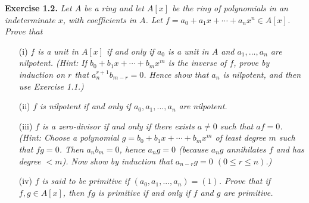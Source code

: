 \documentclass{article}
\begin{document}



\textbf{Exercise 1.2.}
\emph{Let $A$ be a ring and
let $A[x]$ be the ring of polynomials in an indeterminate $x$,
with coefficients in $A$.
Let $f = a_0 + a_1 x + \cdots + a_n x^n \in A[x]$.
Prove that}
\begin{enumerate}
\item[(i)]
\emph{$f$ is a unit in $A[x]$ if and only if
$a_0$ is a unit in $A$ and
$a_1, ..., a_n$ are nilpotent.
(Hint: If $b_0 + b_1 x + \cdots + b_m x^m$ is the inverse of $f$,
prove by induction on $r$ that $a_n^{r+1} b_{m-r} = 0$.
Hence show that $a_n$ is nilpotent, and then use Exercise 1.1.)}
\item[(ii)]
\emph{$f$ is nilpotent if and only if
$a_0, a_1, ..., a_n$ are nilpotent.}
\item[(iii)]
\emph{$f$ is a zero-divisor if and only if
there exists $a \neq 0$ such that $af = 0$.
(Hint: Choose a polynomial $g = b_0 + b_1 x + \cdots + b_m x^m$
of least degree $m$ such that $fg = 0$.
Then $a_n b_m = 0$, hence $a_n g = 0$
(because $a_n g$ annihilates $f$ and has degree $< m$).
Now show by induction that $a_{n-r}g = 0$ $(0 \leq r \leq n)$.)}
\item[(iv)]
\emph{$f$ is said to be primitive if $(a_0, a_1, ..., a_n) = (1)$.
Prove that if $f, g \in A[x]$, then $fg$ is primitive if and only if
$f$ and $g$ are primitive.} \\
\end{enumerate}
\end{document}
